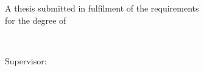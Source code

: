 \begin{titlepage}
  \centering
  \vspace*{1.5cm}
  {\LARGE\bfseries \thesistitle\par}
  \vspace{2cm}
  {\Large \thesisauthor\par}
  \vfill
  A thesis submitted in fulfilment of the requirements\\
  for the degree of \thesisdegree\par
  \vspace{1cm}
  \thesisdepartment\\
  \thesisuniversity\par
  \vspace{1cm}
  Supervisor: \thesissupervisor\par
  \vspace{1.5cm}
  \thesisdate\par
\end{titlepage}
